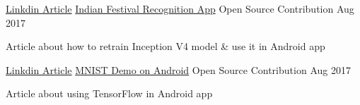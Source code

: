 \begin{cventries}
  \cventry
    {\href{https://www.linkedin.com/pulse/indian-festival-recognition-app-ishwar-sawale/}{Linkdin Article}} %
    {\href{https://www.linkedin.com/pulse/indian-festival-recognition-app-ishwar-sawale/}{Indian Festival Recognition App}} %
    {Open Source Contribution} %
    {Aug 2017} %
    {
      \begin{cvitems} %
        \item {Article about how to retrain Inception V4 model \& use it in Android app}
      \end{cvitems}
    }

    \cventry
    {\href{https://www.linkedin.com/pulse/handwritten-digits-classification-from-mnist-android-keras-sawale/}{Linkdin Article}} %
    {\href{https://www.linkedin.com/pulse/handwritten-digits-classification-from-mnist-android-keras-sawale/}{MNIST Demo on Android}} %
    {Open Source Contribution} %
    {Aug 2017} %
    {
      \begin{cvitems} %
        \item {Article about using TensorFlow in Android app} 
      \end{cvitems}
    }










\end{cventries}
